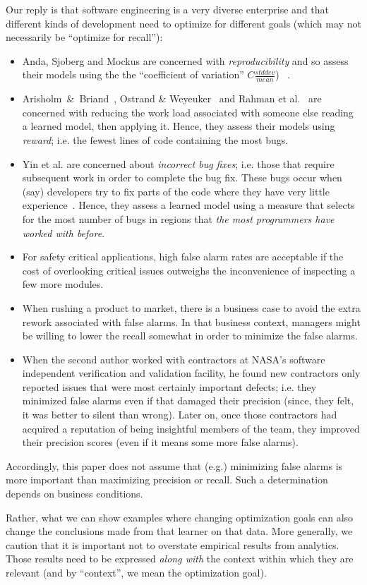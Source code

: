 \documentclass[final,twocolumn,5p]{elsarticle}
\newcommand{\bi}{\begin{itemize}[leftmargin=0.4cm]}
\newcommand{\ei}{\end{itemize}}
\begin{document}
Our reply is that software engineering is a very diverse enterprise
and that different kinds of development need to optimize for different goals
(which may not necessarily be ``optimize for recall''):
\bi
\item
Anda, Sjoberg and Mockus are concerned with {\em reproducibility}  and so
assess their models using the the ``coefficient of variation'' $C\frac{stddev}{mean}$) ~\cite{anda09}.
\item
Arisholm~\&~Briand~\cite{arisholm06},  Ostrand \& Weyeuker~\cite{ostrand04} and Rahman et al.~\cite{rahman12} are concerned with reducing the work load associated with someone
else reading a learned model, then applying it. Hence, they assess their models using  {\em reward}; i.e.   the fewest lines of code
  containing the most bugs.
\item
Yin et al. are concerned about
 {\em incorrect bug fixes}; i.e. those that require subsequent work in order to complete the bug fix.
These bugs occur  when (say) developers try to fix parts of the code
where they have very little experience~\cite{yin11}.  Hence, they assess a learned
model using a measure that selects for  the most number of bugs in regions that {\em the most programmers have worked with before}.
\item
For safety critical applications, high false alarm rates are  acceptable if the cost
of overlooking  critical issues outweighs the inconvenience of   inspecting a few more
modules. 
\item
When rushing a product to market,  there is a business case to 
avoid the extra rework associated with false alarms.  In that business context, 
managers might be willing to lower the recall somewhat in order to minimize the false alarms.
\item
When the second author worked with contractors at  NASA's software independent verification
and validation facility, he found  new contractors  
only reported issues that were most certainly important defects; i.e. they minimized
  false alarms even if that damaged their precision (since, they felt, 
it was better to silent than wrong). Later on, once
those contractors had acquired a reputation of being insightful members of the team,
they improved their precision scores (even if it means some more false alarms).
\ei
Accordingly, this paper does not assume that (e.g.) minimizing false alarms is 
more important than maximizing   precision or recall. Such a determination 
depends on   business conditions.

Rather, what we can  show  examples where  changing  optimization goals can also change 
the conclusions made from that learner on that data. More generally, we caution that it is 
important not to overstate  empirical results from  analytics.
Those results need to be expressed {\em along with} the context within which they are
relevant (and by ``context'', we mean the optimization goal).
\end{document}
